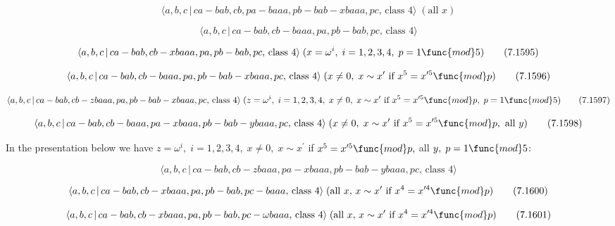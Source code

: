 \documentclass[10pt]{article}
\begin{document}
\begin{equation}
\langle a,b,c\,|\,ca-bab,cb,pa-baaa,pb-bab-xbaaa,pc,\,\text{class }4\rangle
\;(\text{all }x)  \tag{7.1593}
\end{equation}

\begin{equation}
\langle a,b,c\,|\,ca-bab,cb-baaa,pa,pb-bab,pc,\,\text{class }4\rangle 
\tag{7.1594}
\end{equation}

\begin{equation}
\langle a,b,c\,|\,ca-bab,cb-xbaaa,pa,pb-bab,pc,\,\text{class }4\rangle
\;(x=\omega ^{i},\;i=1,2,3,4,\;p=1\func{mod}5)  \tag{7.1595}
\end{equation}

\begin{equation}
\langle a,b,c\,|\,ca-bab,cb-baaa,pa,pb-bab-xbaaa,pc,\,\text{class }4\rangle
\;(x\neq 0,\;x\sim x^{\prime }\text{ if }x^{5}=x^{\prime 5}\func{mod}p) 
\tag{7.1596}
\end{equation}

\begin{equation}
\langle a,b,c\,|\,ca-bab,cb-zbaaa,pa,pb-bab-xbaaa,pc,\,\text{class }4\rangle
\;(z=\omega ^{i},\;i=1,2,3,4,\;x\neq 0,\;x\sim x^{\prime }\text{ if }%
x^{5}=x^{\prime 5}\func{mod}p,\;p=1\func{mod}5)  \tag{7.1597}
\end{equation}

\begin{equation}
\langle a,b,c\,|\,ca-bab,cb-baaa,pa-xbaaa,pb-bab-ybaaa,pc,\,\text{class }%
4\rangle \;(x\neq 0,\;x\sim x^{\prime }\text{ if }x^{5}=x^{\prime 5}\func{mod%
}p,\text{ all }y)  \tag{7.1598}
\end{equation}

In the presentation below we have $z=\omega ^{i},\;i=1,2,3,4,\;x\neq
0,\;x\sim x^{\prime }$ if $x^{5}=x^{\prime 5}\func{mod}p,$ all $y,\;p=1\func{%
mod}5$:

\begin{equation}
\langle a,b,c\,|\,ca-bab,cb-zbaaa,pa-xbaaa,pb-bab-ybaaa,pc,\,\text{class }%
4\rangle  \tag{7.1599}
\end{equation}

\begin{equation}
\langle a,b,c\,|\,ca-bab,cb-xbaaa,pa,pb-bab,pc-baaa,\,\text{class }4\rangle
\;(\text{all }x,\,x\sim x^{\prime}\text{ if }x^4=x^{\prime 4}\func{mod}p) 
\tag{7.1600}
\end{equation}

\begin{equation}
\langle a,b,c\,|\,ca-bab,cb-xbaaa,pa,pb-bab,pc-\omega baaa,\,\text{class }%
4\rangle \;(\text{all }x,\,x\sim x^{\prime}\text{ if }x^4=x^{\prime 4}\func{%
mod}p)  \tag{7.1601}
\end{equation}
\end{document}
